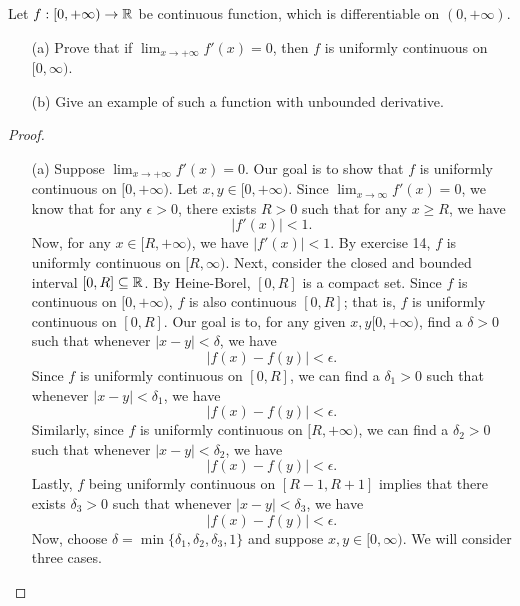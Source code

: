\documentclass[a4paper]{article}
\begin{document}
\begin{problem}
    Let  \( f : [0,+\infty) \to \mathbb{R}  \) be continuous function, which is differentiable on \( (0,+ \infty ) \).
    \begin{enumerate}
        \item[(a)] Prove that if \( \lim_{ x \to  + \infty  } f'(x) = 0  \), then \( f  \) is uniformly continuous on \( [0,\infty ) \).
        \item[(b)] Give an example of such a function with unbounded derivative.
    \end{enumerate}
\end{problem}
\begin{proof}
\begin{enumerate}
    \item[(a)] Suppose \( \lim_{ x \to + \infty  }  f'(x) = 0  \). Our goal is to show that \( f  \) is uniformly continuous on \( [0,+\infty) \). Let \( x,y \in [0,+\infty) \). Since \( \lim_{ x \to \infty  } f'(x) = 0   \), we know that for any \( \epsilon > 0  \), there exists \( R > 0  \) such that for any \( x \geq R  \), we have  
        \[  | f'(x) | < 1. \]
        Now, for any \( x \in [R, +\infty) \), we have \( | f'(x) | < 1  \). By exercise 14, \( f  \) is uniformly continuous on \( [R,\infty) \). Next, consider the closed and bounded interval \( [0,R] \subseteq \mathbb{R}  \). By Heine-Borel, \( [0,R] \) is a compact set. Since \( f  \) is continuous on \( [0,+\infty) \), \( f  \) is also continuous \( [0,R] \); that is, \( f  \) is uniformly continuous on \( [0,R] \). Our goal is to, for any given \( x,y [0,+\infty) \), find a \( \delta > 0  \) such that whenever \( | x - y | < \delta \), we have
        \[  | f(x) - f(y) | < \epsilon. \]
        Since \( f  \) is uniformly continuous on \( [0,R] \), we can find a \( {\delta}_{1} > 0 \) such that whenever \( | x - y  | < {\delta}_{1} \), we have
        \[  | f(x) - f(y) | < \epsilon. \tag{1} \]
        Similarly, since \( f  \) is uniformly continuous on \( [R,+\infty) \), we can find a \( {\delta}_{2} > 0   \) such that whenever \( |  x - y  |  < {\delta}_{2} \), we have
        \[  | f(x) - f(y) | < \epsilon. \tag{2} \]
        Lastly, \( f  \) being uniformly continuous on \( [R-1,R+1] \) implies that there exists \( {\delta}_{3} > 0  \) such that whenever \( | x - y  |  < {\delta}_{3} \), we have 
        \[  | f(x) - f(y) | < \epsilon. \tag{3} \]
        Now, choose \( \delta = \min \{ {\delta}_{1} , {\delta}_{2}, {\delta}_{3}, 1  \}  \) and suppose \( x,y \in [0,\infty) \). We will consider three cases. 
        \begin{enumerate}

\end{enumerate}
\end{enumerate}
\end{proof}
\end{document}
